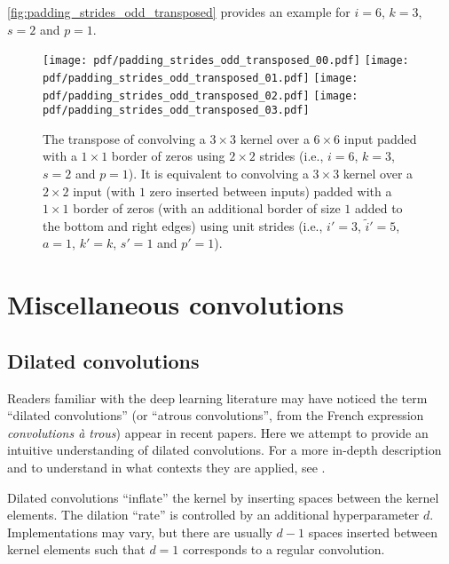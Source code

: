 \documentclass[notitlepage]{report}
\begin{document}
\autoref{fig:padding_strides_odd_transposed} provides an example for $i = 6$, $k
= 3$, $s = 2$ and $p = 1$.

\begin{figure}[p]
    \centering
    \texttt{[image: pdf/padding\_strides\_odd\_transposed\_00.pdf]}
    \texttt{[image: pdf/padding\_strides\_odd\_transposed\_01.pdf]}
    \texttt{[image: pdf/padding\_strides\_odd\_transposed\_02.pdf]}
    \texttt{[image: pdf/padding\_strides\_odd\_transposed\_03.pdf]}
    \caption{\label{fig:padding_strides_odd_transposed} The transpose of
        convolving a $3 \times 3$ kernel over a $6 \times 6$ input padded with a
        $1 \times 1$ border of zeros using $2 \times 2$ strides (i.e., $i = 6$,
        $k = 3$, $s = 2$ and $p = 1$). It is equivalent to convolving a $3
        \times 3$ kernel over a $2 \times 2$ input (with $1$ zero inserted
        between inputs) padded with a $1 \times 1$ border of zeros (with an
        additional border of size $1$ added to the bottom and right edges) using
        unit strides (i.e., $i' = 3$, $\tilde{i}' = 5$, $a = 1$, $k' = k$, $s' =
        1$ and $p' = 1$).}
\end{figure}

\chapter{Miscellaneous convolutions}

\section{Dilated convolutions}

Readers familiar with the deep learning literature may have noticed the term
``dilated convolutions'' (or ``atrous convolutions'', from the French expression
{\em convolutions \`{a} trous}) appear in recent papers. Here we attempt to
provide an intuitive understanding of dilated convolutions. For a more in-depth
description and to understand in what contexts they are applied, see
\citet{chen2014semantic,yu2015multi}.

Dilated convolutions ``inflate'' the kernel by inserting spaces between the
kernel elements. The dilation ``rate'' is controlled by an additional
hyperparameter $d$. Implementations may vary, but there are usually $d - 1$
spaces inserted between kernel elements such that $d = 1$ corresponds to a
regular convolution.
\end{document}
